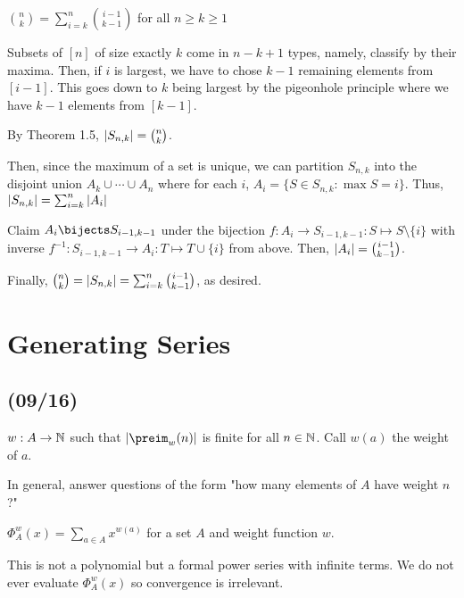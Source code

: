 \begin{example}
  $\binom{n}{k} = \sum_{i=k}^{n} \binom{i-1}{k-1}$ for all $n \geq k \geq 1$
\end{example}
\begin{prf}[informal]
  Subsets of $[n]$ of size exactly $k$ come in $n-k+1$ types, namely, classify by their maxima.
  Then, if $i$ is largest, we have to chose $k-1$ remaining elements from $[i-1]$.
  This goes down to $k$ being largest by the pigeonhole principle where we have $k-1$ elements from $[k-1]$.
\end{prf}
\begin{prf}
  By Theorem 1.5, $\abs{S_{n,k}} = \binom{n}{k}$.

  Then, since the maximum of a set is unique, we can partition $S_{n,k}$
  into the disjoint union $A_k \cup \dotsb \cup A_n$ where for each $i$,
  $A_i = \{S \in S_{n,k} : \max S = i\}$.
  Thus, $\abs{S_{n,k}} = \sum_{i=k}^n \abs{A_i}$

  Claim $A_i \bijects S_{i-1,k-1}$ under the bijection
  $f : A_i \to S_{i-1,k-1} : S \mapsto S \setminus \{i\}$ with inverse
  $f^{-1} : S_{i-1,k-1} \to A_i : T \mapsto T \cup \{i\}$ from above.
  Then, $\abs{A_i} = \binom{i-1}{k-1}$.

  Finally, $\binom{n}{k} = \abs{S_{n,k}} = \sum_{i=k}^n \binom{i-1}{k-1}$, as desired.
\end{prf}

\chapter{Generating Series}

\section{(09/16)}

\begin{defn}
  $w : A \to \mathbb{N}$ such that $\abs{\preim_w(n)}$ is finite for all $n \in \mathbb{N}$.
  Call $w(a)$ the weight of $a$.
\end{defn}

In general, answer questions of the form "how many elements of $A$ have weight $n$?"

\begin{defn}
  $\Phi_A^w(x) = \sum_{a\in A} x^{w(a)}$ for a set $A$ and weight function $w$.
\end{defn}

This is not a polynomial but a formal power series with infinite terms.
We do not ever evaluate $\Phi_A^w(x)$ so convergence is irrelevant.

